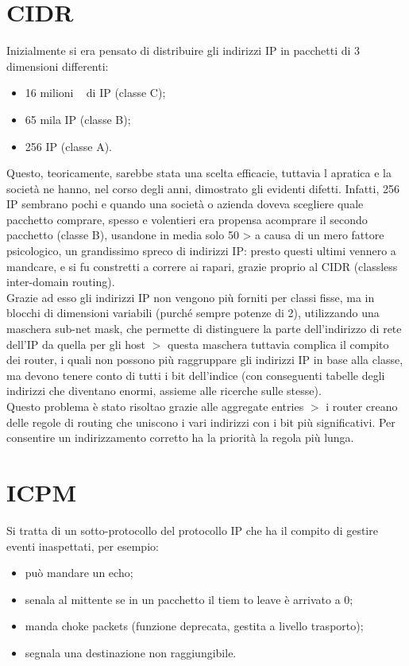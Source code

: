 \documentclass{article}
\begin{document}
\section{CIDR}
Inizialmente si era pensato di distribuire gli indirizzi IP in pacchetti di 3
dimensioni differenti:
\begin{itemize}
	\item 16 milioni ~ di IP (classe C);
	\item 65 mila IP (classe B);
	\item 256 IP (classe A).
\end{itemize}
Questo, teoricamente, sarebbe stata una scelta efficacie, tuttavia l apratica e
la società ne hanno, nel corso degli anni, dimostrato gli evidenti difetti.
Infatti, 256 IP sembrano pochi e quando una società o azienda doveva scegliere
quale pacchetto comprare, spesso e volentieri era propensa  acomprare il secondo
pacchetto (classe B), usandone in media solo 50 > a causa di un mero fattore
psicologico, un grandissimo spreco di indirizzi IP: presto questi ultimi vennero
a mandcare, e si fu constretti a correre ai rapari, grazie proprio al CIDR
(classless inter-domain routing).\\
Grazie ad esso gli indirizzi IP non vengono più forniti per classi fisse, ma in
blocchi di dimensioni variabili (purché sempre potenze di 2), utilizzando una
maschera sub-net mask, che permette di distinguere la parte dell'indirizzo di
rete dell'IP da quella per gli host $>$ questa maschera tuttavia complica il
compito dei router, i quali non possono più raggruppare gli indirizzi IP in base
alla classe, ma devono tenere conto di tutti i bit dell'indice (con conseguenti
tabelle degli indirizzi che diventano enormi, assieme alle ricerche sulle
stesse).\\
Questo problema è stato risoltao grazie alle aggregate entries $>$ i router
creano delle regole di routing che uniscono i vari indirizzi con i bit più
significativi. Per consentire un indirizzamento corretto ha la priorità la
regola più lunga.

\section{ICPM}
Si tratta di un sotto-protocollo del protocollo IP che ha il compito di gestire
eventi inaspettati, per esempio:
\begin{itemize}
	\item può mandare un echo;

	\item senala al mittente se in un pacchetto il tiem to leave è arrivato a 0;

	\item manda choke packets (funzione deprecata, gestita a livello trasporto);

	\item segnala una destinazione non raggiungibile.
\end{itemize}
\end{document}
